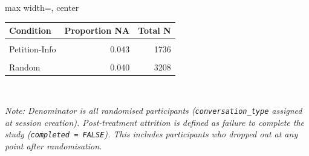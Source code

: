 \renewcommand{\arraystretch}{1.2}
\begin{adjustbox}{max width=\linewidth, center}
\begingroup\fontsize{10}{12}\selectfont

\begin{tabular}{lrr}
\toprule
\textbf{Condition} & \textbf{Proportion NA} & \textbf{Total N}\\
\midrule
\cellcolor{gray!15}{Control} & \cellcolor{gray!15}{0.034} & \cellcolor{gray!15}{1759}\\
Petition-Info & 0.043 & 1736\\
\cellcolor{gray!15}{Org-Info} & \cellcolor{gray!15}{0.046} & \cellcolor{gray!15}{1709}\\
Random & 0.040 & 3208\\
\bottomrule
\end{tabular}
\endgroup{}

\end{adjustbox}
\\[3pt]
\begin{minipage}{\linewidth}
\raggedright\footnotesize\textit{Note: Denominator is all randomised participants (\texttt{conversation\_type} assigned at session creation). Post-treatment attrition is defined as failure to complete the study (\texttt{completed = FALSE}). This includes participants who dropped out at any point after randomisation.}
\end{minipage}

